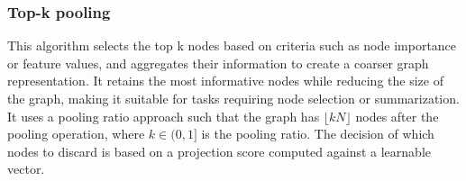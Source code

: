 \subsubsection{Top-k pooling} 
This algorithm selects the top k nodes based on criteria such as node importance or feature values, and aggregates their information to create a coarser graph representation. It retains the most informative nodes while reducing the size of the graph, making it suitable for tasks requiring node selection or summarization. It uses a pooling ratio approach such that the graph has $\lfloor kN \rfloor$ nodes after the pooling operation, where $k \in (0, 1]$ is the pooling ratio. The decision of which nodes to discard is based on a projection score computed against a learnable vector. 
